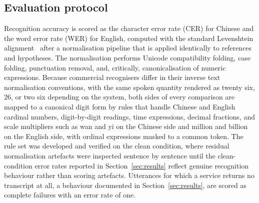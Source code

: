 \subsection{Evaluation protocol}

Recognition accuracy is scored as the character error rate (CER) for Chinese
and the word error rate (WER) for English, computed with the standard
Levenshtein alignment~\cite{levenshtein1966binary} after a normalisation
pipeline that is applied identically to references and hypotheses. The
normalisation performs Unicode compatibility folding, case folding,
punctuation removal, and, critically, canonicalisation of numeric
expressions. Because commercial recognisers differ in their inverse text
normalisation conventions, with the same spoken quantity rendered as twenty
six, 26, or two six depending on the system, both sides of every comparison
are mapped to a canonical digit form by rules that handle Chinese and
English cardinal numbers, digit-by-digit readings, time expressions, decimal
fractions, and scale multipliers such as wan and yi on the Chinese side and
million and billion on the English side, with ordinal expressions masked to
a common token. The rule set was developed and verified on the clean
condition, where residual normalisation artefacts were inspected sentence by
sentence until the clean-condition error rates reported in
Section~\ref{sec:results} reflect genuine recognition behaviour rather than
scoring artefacts. Utterances for which a service returns no transcript at
all, a behaviour documented in Section~\ref{sec:results}, are scored as
complete failures with an error rate of one.

